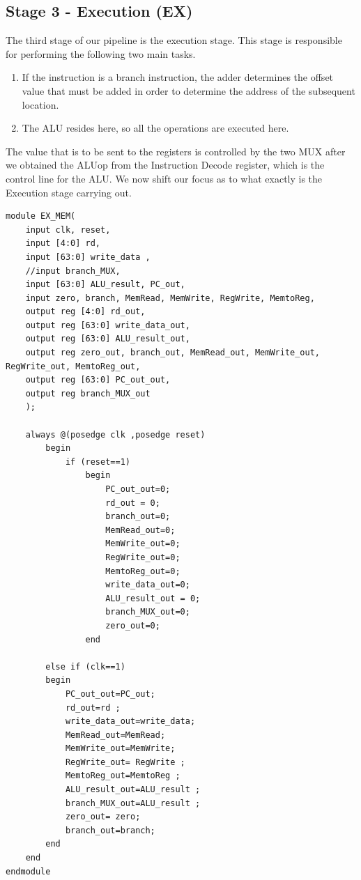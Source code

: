\documentclass{article}
\begin{document}
\subsection*{Stage 3 - Execution (EX)}
The third stage of our pipeline is the execution stage. This stage is responsible for performing the following two main tasks. 

\begin{enumerate}
    \item If the instruction is a branch instruction, the adder determines the offset value that must be added in order to determine the address of the subsequent location.
    \item The ALU resides here, so all the operations are executed here.
\end{enumerate}

The value that is to be sent to the registers is controlled by the two MUX after we obtained the ALUop from the Instruction Decode register, which is the control line for the ALU. We now shift our focus as to what exactly is the Execution stage carrying out. 

\begin{lstlisting}[caption={EX/MEM Register}, captionpos=b, language=RISC-V]
module EX_MEM(
    input clk, reset,
    input [4:0] rd,
    input [63:0] write_data , 
    //input branch_MUX,
    input [63:0] ALU_result, PC_out,
    input zero, branch, MemRead, MemWrite, RegWrite, MemtoReg, 
    output reg [4:0] rd_out,
    output reg [63:0] write_data_out, 
    output reg [63:0] ALU_result_out, 
    output reg zero_out, branch_out, MemRead_out, MemWrite_out, RegWrite_out, MemtoReg_out, 
    output reg [63:0] PC_out_out,
    output reg branch_MUX_out
    );

    always @(posedge clk ,posedge reset)
        begin
            if (reset==1)
                begin
                    PC_out_out=0;
                    rd_out = 0;
                    branch_out=0;
                    MemRead_out=0;
                    MemWrite_out=0;
                    RegWrite_out=0;
                    MemtoReg_out=0;
                    write_data_out=0; 
                    ALU_result_out = 0;
                    branch_MUX_out=0;
                    zero_out=0;
                end

        else if (clk==1)
        begin
            PC_out_out=PC_out;
            rd_out=rd ;
            write_data_out=write_data; 
            MemRead_out=MemRead;
            MemWrite_out=MemWrite;
            RegWrite_out= RegWrite ;
            MemtoReg_out=MemtoReg ;
            ALU_result_out=ALU_result ;
            branch_MUX_out=ALU_result ;
            zero_out= zero;
            branch_out=branch;  
        end
    end
endmodule

\end{lstlisting}
\end{document}
